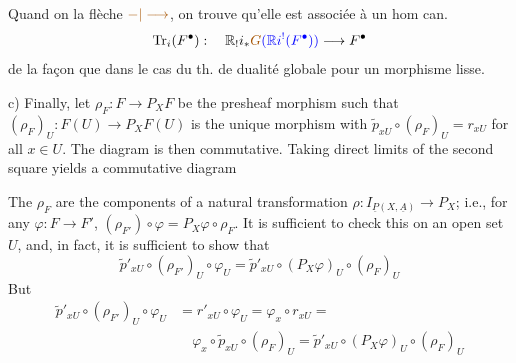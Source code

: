 Quand on  la flèche $\unsure{-|\longrightarrow}$, on trouve
qu'elle est associée à un hom can.
\[
\operatorname{Tr}_i(F^\bullet):\quad
\mathbb{R}_!i_*\deleted{\unsure{G}}\inserted{(\mathbb{R}i^!(F^\bullet))}
\longrightarrow F^\bullet
\]
de la  façon que dans le cas du th.
de dualité globale pour un morphisme
lisse.


c) Finally, let $\rho_F:F\longrightarrow P_XF$ be the presheaf morphism
such that $(\rho_F)_U:F(U)\longrightarrow P_XF(U)$ is the unique morphism with
$\tilde{p}_{xU}\circ(\rho_F)_U=r_{xU}$ for all $x\in U$. The diagram
is then commutative. Taking direct limits of the second square
yields a commutative diagram

The $\rho_F$ are the components of a natural transformation
$\rho:I_{\underline{P}(X,\underline{A})}\longrightarrow P_X$; i.e., for any $\varphi:F\longrightarrow F'$,
$(\rho_{F'})\circ\varphi=P_X\varphi\circ\rho_F$. It is sufficient to check this on an
open set $U$, and, in fact, it is sufficient to show that
\[
\tilde{p}'_{xU}\circ(\rho_{F'})_U\circ\varphi_U
=\tilde{p}'_{xU}\circ(P_X\varphi)_U\circ(\rho_F)_U
\]
But
\[
\begin{aligned}
\tilde{p}'_{xU}\circ(\rho_{F'})_U\circ\varphi_U
&=r'_{xU}\circ\varphi_U=\varphi_x\circ r_{xU}=\\
&\quad\varphi_x\circ\tilde{p}_{xU}\circ(\rho_F)_U
=\tilde{p}'_{xU}\circ(P_X\varphi)_U\circ(\rho_F)_U
\end{aligned}
\]



